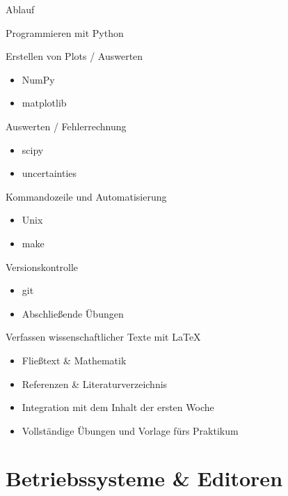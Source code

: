 \begin{frame}{Ablauf}
  \begin{description}
    \item[Montag] Programmieren mit Python
    \item[Dienstag] Erstellen von Plots / Auswerten
      \begin{itemize}
        \item NumPy
        \item matplotlib
      \end{itemize}
    \item[Mittwoch] Auswerten / Fehlerrechnung
      \begin{itemize}
        \item scipy
        \item uncertainties
      \end{itemize}
    \item[Donnerstag] Kommandozeile und Automatisierung
      \begin{itemize}
        \item Unix
        \item make
      \end{itemize}
    \item[Freitag] Versionskontrolle
      \begin{itemize}
        \item git
        \item Abschließende Übungen
      \end{itemize}
    \item[Nächste Woche] Verfassen wissenschaftlicher Texte mit \LaTeX{}
      \begin{itemize}
        \item Fließtext \& Mathematik
        \item Referenzen \& Literaturverzeichnis
        \item Integration mit dem Inhalt der ersten Woche
        \item Vollständige Übungen und Vorlage fürs Praktikum
      \end{itemize}
      
  \end{description}
\end{frame}

\section{Betriebssysteme \& Editoren}

